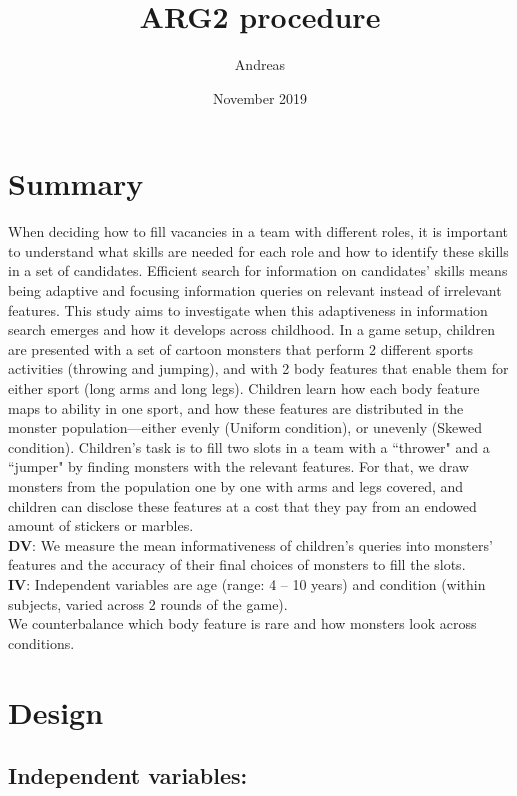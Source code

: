 \documentclass{article}
\title{ARG2 procedure}
\author{ Andreas }
\date{November 2019}
\begin{document}
\maketitle



\section{Summary}

When deciding how to fill vacancies in a team with different roles, it is important to understand what skills are needed for each role and how to identify these skills in a set of candidates.
Efficient search for information on candidates' skills means being adaptive and focusing information queries on relevant instead of irrelevant features.
This study aims to investigate when this adaptiveness in information search emerges and how it develops across childhood.
In a game setup, children are presented with a set of cartoon monsters that perform 2 different sports activities (throwing and jumping), and with 2 body features that enable them for either sport (long arms and long legs).
Children learn how each body feature maps to ability in one sport, and how these features are distributed in the monster population---either evenly (Uniform condition), or unevenly (Skewed condition).
Children's task is to fill two slots in a team with a ``thrower" and a ``jumper" by finding monsters with the relevant features.
For that, we draw monsters from the population one by one with arms and legs covered, and children can disclose these features at a cost that they pay from an endowed amount of stickers or marbles. \\
\textbf{DV}: We measure the mean informativeness of children's queries into monsters' features and the accuracy of their final choices of monsters to fill the slots. \\
\textbf{IV}: Independent variables are age (range: 4 -- 10 years) and condition (within subjects, varied across 2 rounds of the game). \\
We counterbalance which body feature is rare and how monsters look across conditions.



\section{Design}\label{design}

\subsection{Independent variables:}\label{independent-variables}
\end{document}
